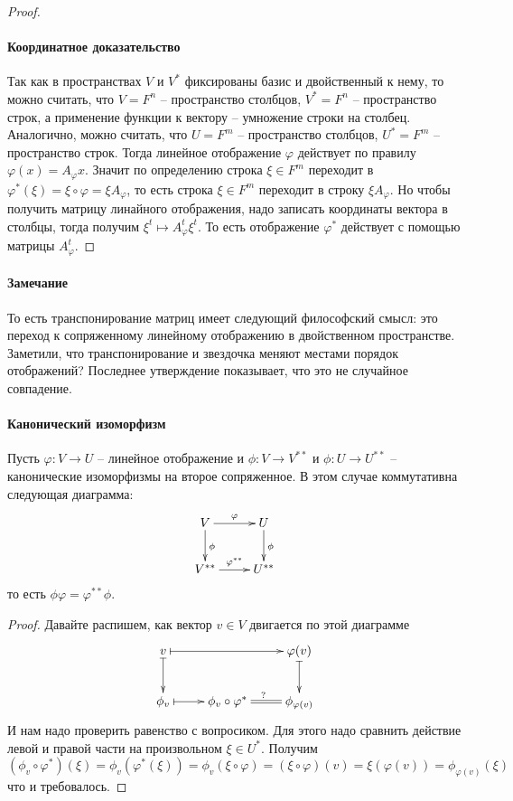 \begin{proof}
\paragraph{Координатное доказательство}

Так как в пространствах $V$ и $V^*$ фиксированы базис и двойственный к нему, то можно считать, что $V = F^n$ -- пространство столбцов, $V^* = F^n$ -- пространство строк, а применение функции к вектору -- умножение строки на столбец.
Аналогично, можно считать, что $U = F^m$ -- пространство столбцов, $U^*=F^m$ -- пространство строк.
Тогда линейное отображение $\varphi$ действует по правилу $\varphi(x) = A_{\varphi} x$.
Значит по определению строка $\xi \in F^m$ переходит в $\varphi^*(\xi) = \xi \circ \varphi = \xi A_{\varphi}$, то есть строка $\xi\in F^m$ переходит в строку $\xi A_{\varphi}$.
Но чтобы получить матрицу линайного отображения, надо записать координаты вектора в столбцы, тогда получим $\xi^t \mapsto A_{\varphi}^t \xi^t$.
То есть отображение $\varphi^*$ действует с помощью матрицы $A_{\varphi}^t$.

\end{proof}

\paragraph{Замечание}

То есть транспонирование матриц имеет следующий философский смысл: это переход к сопряженному линейному отображению в двойственном пространстве.
Заметили, что транспонирование и звездочка меняют местами порядок отображений?
Последнее утверждение показывает, что это не случайное совпадение.

\paragraph{Канонический изоморфизм}

\begin{claim}
\label{claim::CanonicalIsomorphism}
Пусть $\varphi\colon V\to U$ -- линейное отображение и $\phi\colon V\to V^{**}$ и $\phi\colon U\to U^{**}$ -- канонические изоморфизмы на второе сопряженное.
В этом случае коммутативна следующая диаграмма:
\[
\xymatrix{
	{V}\ar[r]^{\varphi}\ar[d]^{\phi}&{U}\ar[d]^{\phi}\\
	{V^{**}}\ar[r]^{\varphi^{**}}&{U^{**}}
}
\]
то есть $\phi \varphi = \varphi^{**}\phi$.
\end{claim}
\begin{proof}
Давайте распишем, как вектор $v\in V$ двигается по этой диаграмме
\[
\xymatrix{
	{v}\ar@{|->}[rr]\ar@{|->}[d]&{}&{\varphi(v)}\ar@{|->}[d]\\
	{\phi_v}\ar@{|->}[r]&{\phi_v\circ \varphi^*}\ar@{=}[r]^{?}&{\phi_{\varphi(v)}}
}
\]
И нам надо проверить равенство с вопросиком.
Для этого надо сравнить действие левой и правой части на произвольном $\xi\in U^*$.
Получим
\[
(\phi_v\circ \varphi^*)(\xi) = \phi_v(\varphi^*(\xi)) = \phi_v(\xi\circ\varphi) = (\xi\circ \varphi) (v) = \xi(\varphi(v)) = \phi_{\varphi(v)}(\xi)
\]
что и требовалось.
\end{proof}

